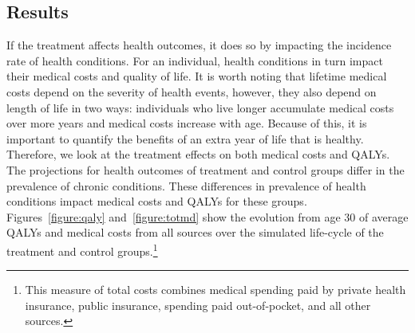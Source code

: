 \subsection{Results}

\noindent If the treatment affects health outcomes, it does so by impacting the incidence rate of health conditions. For an individual, health conditions in turn impact their medical costs and quality of life. It is worth noting that lifetime medical costs depend on the severity of health events, however, they also depend on length of life in two ways: individuals who live longer accumulate medical costs over more years and medical costs increase with age. Because of this, it is important to quantify the benefits of an extra year of life that is healthy. Therefore, we look at the treatment effects on both medical costs and QALYs. \\



%

\noindent The projections for health outcomes of treatment and control groups differ in the prevalence of chronic conditions. These differences in prevalence of health conditions impact medical costs and QALYs for these groups. Figures~\ref{figure:qaly} and~\ref{figure:totmd} show the evolution from age 30 of average QALYs and medical costs from all sources over the simulated life-cycle of the treatment and control groups.\footnote{This measure of total costs combines medical spending paid by private health insurance, public insurance, spending paid out-of-pocket, and all other sources.} 

